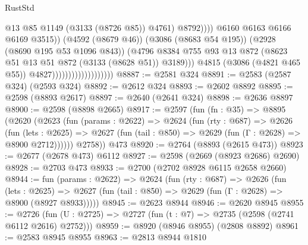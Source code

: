 \begin{lexlean}{RustStd}
\begin{coremodule}
                                                          @13
                                                          @85
                                                          @1149
                                                          (@3133 (@8726 @85))
                                                          @4761)
                                                        @8792))))
                                                @6160
                                                @6163
                                                @6166
                                                @6169
                                                @3515))
                                            (@4592 (@8679 @46))
                                            (@3086 (@8683 @54 @195))
                                            (@2928 (@8690 @195 @53 @1096 @843))
                                            (@4796
                                              @8384
                                              @755
                                              @93
                                              @13
                                              @872
                                              (@8623 @51 @13 @51 @872 (@3133 (@8628 @51)) @3189)))
                                          @4815
                                          (@3086 (@4821 @465 @55))
                                          @4827)))))))))))))))))))
@8887 := @2581 @324
@8891 := @2583 (@2587 @324) (@2593 @324)
@8892 := @2612 @324
@8893 := @2602 @8892
@8895 := @2598 (@8893 @2617)
@8897 := @2640 (@2641 @324)
@8898 := @2636 @8897
@8900 := @2598 (@8898 @2665)
@8917 := @2597
    (fun (fn : @35) =>
    @8895
      (@2620
        (@2623
          (fun (params : @2622) =>
          @2624
            (fun (rty : @687) =>
            @2626
              (fun (lets : @2625) =>
              @2627 (fun (tail : @850) => @2629 (fun (Γ : @2628) => @8900 @2712))))))
        @2758))
    @473
@8920 := @2764 (@8893 (@2615 @473))
@8923 := @2677 (@2678 @473) @6112
@8927 := @2598 (@2669 (@8923 @2686) @2690)
@8928 := @2703 @473
@8933 := @2700 (@2702 @8928 @6115 @2658 @2660)
@8944 := fun (params : @2622) =>
  @2624
    (fun (rty : @687) =>
    @2626
      (fun (lets : @2625) =>
      @2627 (fun (tail : @850) => @2629 (fun (Γ : @2628) => @8900 (@8927 @8933)))))
@8945 := @2623 @8944
@8946 := @2620 @8945
@8955 := @2726 (fun (U : @2725) => @2727 (fun (t : @7) => @2735 (@2598 (@2741 @6112 @2616) @2752)))
@8959 := @8920 (@8946 @8955) (@2808 @8892)
@8961 := @2583 @8945 @8955
@8963 := @2813 @8944 @1810

\end{coremodule}
\end{lexlean}

